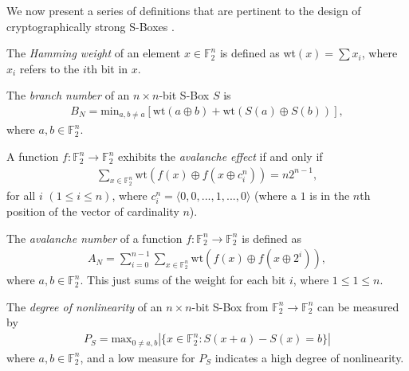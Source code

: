 \documentclass[11pt]{article}
\newcommand{\field}[1]{\mathbb{#1}} %
\begin{document}
We now present a series of definitions that are pertinent to the design of cryptographically strong S-Boxes \cite{Mar_newanalysis}.


\begin{define}
The \emph{Hamming weight} of an element $x \in \field{F}_2^n$ is defined as wt$(x) = \sum x_i$, where $x_i$ refers to the $i$th bit in $x$.
\end{define}

\begin{define}
The \emph{branch number} of an $n \times n$-bit S-Box $S$ is
\begin{eqnarray}
B_N = \text{min}_{a, b\not=a}\left[\text{wt}(a \oplus b) + \text{wt}(S(a) \oplus S(b))\right],
\end{eqnarray}
where $a, b \in \field{F}_2^n$.%
\end{define}

\begin{define}
A function $f : \field{F}_2^n \to \field{F}_2^n$ exhibits the \emph{avalanche effect} if and only if 
\begin{eqnarray}
\sum_{x \in \field{F}_2^n} \text{wt}(f(x) \oplus f(x \oplus c_{i}^{n})) = n2^{n-1},
\end{eqnarray}
for all $i$ $(1 \leq i \leq n)$, where $c_{i}^{n} = \langle 0, 0, ..., 1, ..., 0 \rangle$ (where a $1$ is in the $n$th position of the vector of cardinality $n$).%
\end{define}

\begin{define}
The \emph{avalanche number} of a function $f : \field{F}_2^n \to \field{F}_2^n$ is defined as
\begin{eqnarray}
A_N = \sum_{i = 0}^{n - 1}\sum_{x \in \field{F}_2^n} \text{wt}(f(x) \oplus f(x \oplus 2^{i})),
\end{eqnarray}
where $a, b \in \field{F}_2^n$. This just sums of the weight for each bit $i$, where $1 \leq 1 \leq n$.
\end{define}

\begin{define}
The \emph{degree of nonlinearity} of an $n \times n$-bit S-Box from $\field{F}_2^n \to \field{F}_2^n$ can be measured by
\begin{eqnarray}
	P_S = \text{max}_{0 \not= a, b}|\{x \in \field{F}_2^n : S(x + a) - S(x) = b\}|
\end{eqnarray}
where $a, b \in \field{F}_2^n$, and a low measure for $P_S$ indicates a high degree of nonlinearity.%
\end{define}
\end{document}
